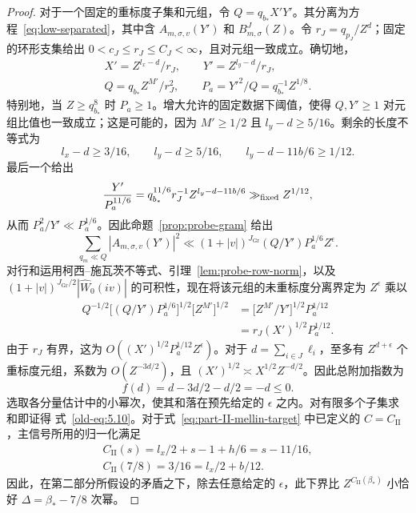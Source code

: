 \documentclass[11pt,a4paper]{article}
\numberwithin{equation}{section}
\numberwithin{figure}{section}
\theoremstyle{definition}
\theoremstyle{remark}
\begin{document}
\begin{proof}
对于一个固定的重标度子集和元组，令 $Q=q_{b_*}X'Y'$。其分离为方程~\eqref{eq:low-separated}，其中含 $A_{m,\sigma,v}(Y')$ 和 $B^J_{m,\sigma}(Z)$。令 $r_J=q_{p_J}/Z^d$；固定的环形支集给出 $0<c_J\le r_J\le C_J<\infty$，且对元组一致成立。确切地，
\[
 \begin{gathered}
 X'=Z^{l_x-d}/r_J,\qquad Y'=Z^{l_y-d}/r_J,\\
 Q=q_{b_*}Z^{M'}/r_J^2,\qquad
 P_a=Y'^2/Q=q_{b_*}^{-1}Z^{1/8}.
 \end{gathered}
\]
特别地，当 $Z\ge q_{b_*}^8$ 时 $P_a\ge1$。增大允许的固定数据下阈值，使得 $Q,Y'\ge1$ 对元组比值也一致成立；这是可能的，因为 $M'\ge1/2$ 且 $l_y-d\ge5/16$。剩余的长度不等式为
\[
 l_x-d\ge3/16,\qquad l_y-d\ge5/16,
 \qquad l_y-d-11b/6\ge1/12.
\]
最后一个给出
\[
 \frac{Y'}{P_a^{11/6}}
 =q_{b_*}^{11/6}r_J^{-1}Z^{l_y-d-11b/6}
       \gg_{\rm fixed}Z^{1/12},
\]
从而 $P_a^2/Y'\ll P_a^{1/6}$。因此命题~\ref{prop:probe-gram} 给出
\begin{equation}
 \sum_{q_m\ll Q}|A_{m,\sigma,v}(Y')|^2
 \ll (1+|v|)^{J_{\mathrm{Gr}}}(Q/Y')P_a^{1/6}Z^\epsilon.
 \label{old-eq:5.6}
\end{equation}
对行和运用柯西--施瓦茨不等式、引理~\ref{lem:probe-row-norm}，以及 $(1+|v|)^{J_{\mathrm{Gr}}/2}|\widehat W_0(iv)|$ 的可积性，现在将该元组的未重标度分离界定为 $Z^\epsilon$ 乘以
\[
 \begin{aligned}
 Q^{-1/2}\bigl[(Q/Y')P_a^{1/6}\bigr]^{1/2}
       \bigl[Z^{M'}\bigr]^{1/2}
 &=\bigl[Z^{M'}/Y'\bigr]^{1/2}P_a^{1/12}\\
 &=r_J(X')^{1/2}P_a^{1/12}.
 \end{aligned}
\]
由于 $r_J$ 有界，这为 $O((X')^{1/2}P_a^{1/12}Z^\epsilon)$。对于 $d=\sum_{i\in J}\ell_i$，至多有 $Z^{d+\epsilon}$
个重标度元组，系数为 $O(Z^{-3d/2})$，且
$(X')^{1/2}\asymp X^{1/2}Z^{-d/2}$。因此总附加指数为
\begin{equation}
 f(d)=d-3d/2-d/2=-d\le0.
 \label{old-eq:5.5}
\end{equation}
选取各分量估计中的小幂次，使其和落在预先给定的 $\epsilon$ 之内。对有限多个子集求和即证得
式~\eqref{old-eq:5.10}。对于式~\eqref{eq:part-II-mellin-target} 中已定义的
$C=C_{\mathrm{II}}$，主信号所用的归一化满足
\begin{equation}
 \begin{gathered}
 C_{\mathrm{II}}(s)=l_x/2+s-1+h/6=s-11/16,\\
 C_{\mathrm{II}}(7/8)=3/16=l_x/2+b/12.
 \end{gathered}
 \label{old-eq:5.11}
\end{equation}
因此，在第二部分所假设的矛盾之下，除去任意给定的 $\epsilon$，此下界比 $Z^{C_{\mathrm{II}}(\beta_*)}$ 小恰好
$\Delta=\beta_*-7/8$ 次幂。
\end{proof}
\end{document}
